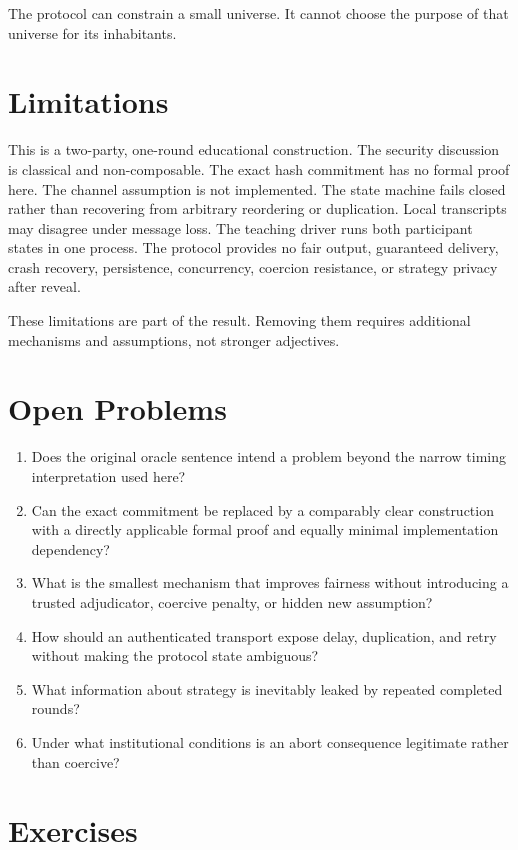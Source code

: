 The protocol can constrain a small universe. It cannot choose the purpose of
that universe for its inhabitants.

\section{Limitations}

This is a two-party, one-round educational construction. The security
discussion is classical and non-composable. The exact hash commitment has no
formal proof here. The channel assumption is not implemented. The state
machine fails closed rather than recovering from arbitrary reordering or
duplication. Local transcripts may disagree under message loss. The teaching
driver runs both participant states in one process. The protocol provides no
fair output, guaranteed delivery, crash recovery, persistence, concurrency,
coercion resistance, or strategy privacy after reveal.

These limitations are part of the result. Removing them requires additional
mechanisms and assumptions, not stronger adjectives.

\section{Open Problems}

\begin{enumerate}
    \item Does the original oracle sentence intend a problem beyond the narrow
    timing interpretation used here?
    \item Can the exact commitment be replaced by a comparably clear
    construction with a directly applicable formal proof and equally minimal
    implementation dependency?
    \item What is the smallest mechanism that improves fairness without
    introducing a trusted adjudicator, coercive penalty, or hidden new
    assumption?
    \item How should an authenticated transport expose delay, duplication, and
    retry without making the protocol state ambiguous?
    \item What information about strategy is inevitably leaked by repeated
    completed rounds?
    \item Under what institutional conditions is an abort consequence
    legitimate rather than coercive?
\end{enumerate}

\section{Exercises}

